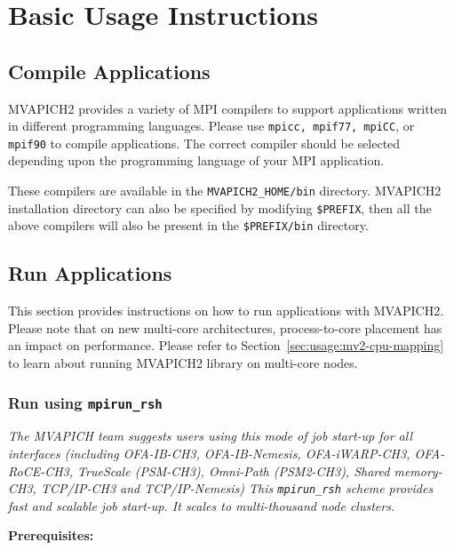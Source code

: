 \section{Basic Usage Instructions}
\label{sec:usage}

\subsection{Compile Applications}
\label{sec:compile-mpi}

MVAPICH2 provides a variety of MPI compilers to support applications
written in different programming languages.  Please use \texttt{mpicc,
mpif77, mpiCC}, or \texttt{mpif90} to compile applications. The correct
compiler should be selected depending upon the programming language of
your MPI application.

These compilers are available in the \texttt{MVAPICH2\_HOME/bin}
directory.  MVAPICH2 installation directory can also be specified by
modifying \texttt{\$PREFIX}, then all the above compilers will also be
present in the \texttt{\$PREFIX/bin} directory.

\subsection{Run Applications}
\label{sec:run-applications}

This section provides instructions on how to run applications with
MVAPICH2. Please note that on new multi-core architectures,
process-to-core placement has an impact on performance. Please refer to
Section~\ref{sec:usage:mv2-cpu-mapping} to learn about running MVAPICH2
library on multi-core nodes.

\subsubsection{Run using \texttt{mpirun\_rsh}}
\label{sec:run-mpirun-rsh}

{\em The MVAPICH team suggests users using this mode of job start-up
for all interfaces (including OFA-IB-CH3, OFA-IB-Nemesis, OFA-iWARP-CH3,
OFA-RoCE-CH3, TrueScale (PSM-CH3), Omni-Path (PSM2-CH3), Shared memory-CH3,
TCP/IP-CH3 and TCP/IP-Nemesis)
This \texttt{mpirun\_rsh} scheme provides fast and scalable job start-up.
It scales to multi-thousand node clusters.}

\textbf{Prerequisites:}

